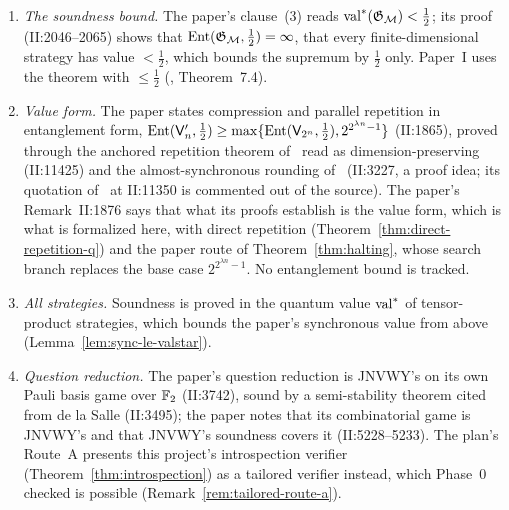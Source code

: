 \begin{remark}
\label{rem:tailored-route}
\begin{enumerate}
\item \emph{The soundness bound.} The paper's clause~(3) reads $\mathrm{val}^*(\mathfrak{G}_{\mathcal{M}}) <
  \frac12$; its proof (II:2046--2065) shows that $\mathrm{Ent}(\mathfrak{G}_{\mathcal{M}}, \frac12) = \infty$, that
  every finite-dimensional strategy has value $< \frac12$, which bounds the supremum by
  $\frac12$ only. Paper~I uses the theorem with $\leq \frac12$ (\cite{BCLV24}, Theorem~7.4).
\item \emph{Value form.} The paper states compression and parallel repetition in entanglement
  form, $\mathrm{Ent}(\mathsf{V}'_n, \frac12) \geq \max\{\mathrm{Ent}(\mathsf{V}_{2^n}, \frac12),
  2^{2^{\lambda n} - 1}\}$ (II:1865), proved through the anchored repetition theorem
  of~\cite{BVY17} read as dimension-preserving (II:11425) and the almost-synchronous rounding
  of~\cite{Vid22} (II:3227, a proof idea; its quotation of~\cite{Vid22} at II:11350 is commented
  out of the source). The paper's Remark~II:1876 says that what its proofs establish is the
  value form, which is what is formalized here, with direct repetition
  (Theorem~\ref{thm:direct-repetition-q}) and the paper route of Theorem~\ref{thm:halting}, whose
  search branch replaces the base case $2^{2^{\lambda n} - 1}$. No entanglement bound is
  tracked.
\item \emph{All strategies.} Soundness is proved in the quantum value $\mathrm{val}^*$ of tensor-product
  strategies, which bounds the paper's synchronous value from above
  (Lemma~\ref{lem:sync-le-valstar}).
\item \emph{Question reduction.} The paper's question reduction is JNVWY's on its own Pauli basis
  game over $\mathbb{F}_2$ (II:3742), sound by a semi-stability theorem cited from de la Salle (II:3495);
  the paper notes that its combinatorial game is JNVWY's and that JNVWY's soundness covers it
  (II:5228--5233). The plan's Route~A presents this project's introspection verifier
  (Theorem~\ref{thm:introspection}) as a tailored verifier instead, which Phase~0 checked is
  possible (Remark~\ref{rem:tailored-route-a}).
\end{enumerate}
\end{remark}

